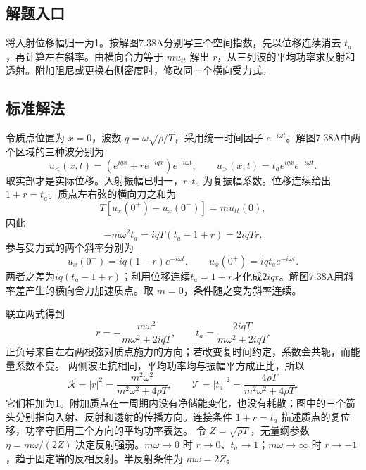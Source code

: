 \documentclass[UTF8,fontset=fandol,a4paper,11pt]{ctexart}
\newcommand{\figcaption}[1]{\par\vspace{2pt}{\small\color{muted}#1}\par}
\begin{document}


\subsection*{解题入口}

将入射位移幅归一为1。按解图7.38A分别写三个空间指数，先以位移连续消去 $t_a$，再计算左右斜率。由横向合力等于 $mu_{tt}$ 解出 $r$，从三列波的平均功率求反射和透射。附加阻尼或更换右侧密度时，修改同一个横向受力式。



\subsection*{标准解法}

\begin{center}\begin{minipage}{\linewidth}\centering{}\figcaption{解图 7.38A}\end{minipage}\end{center}
令质点位置为 $x=0$，波数 $q=\omega\sqrt{\rho/T}$，采用统一时间因子 $e^{-i\omega t}$。解图7.38A中两个区域的三种波分别为
\[u_<(x,t)=(e^{iqx}+r e^{-iqx})e^{-i\omega t},\qquad
u_>(x,t)=t_a e^{iqx}e^{-i\omega t}.\]
取实部才是实际位移。入射振幅已归一，$r,t_a$ 为复振幅系数。位移连续给出 $1+r=t_a$。质点左右弦的横向力之和为
\[T[u_x(0^+)-u_x(0^-)]=m u_{tt}(0),\]
因此
\[-m\omega^2t_a=iqT(t_a-1+r)=2iqTr.\]
参与受力式的两个斜率分别为
\[u_x(0^-)=iq(1-r)e^{-i\omega t},\qquad
u_x(0^+)=iqt_a e^{-i\omega t}.\]
两者之差为$iq(t_a-1+r)$；利用位移连续$t_a=1+r$才化成$2iqr$。解图7.38A用斜率差产生的横向合力加速质点。取 $m=0$，条件随之变为斜率连续。

联立两式得到
\[\boxed{r=-\frac{m\omega^2}{m\omega^2+2iqT},\qquad
 t_a=\frac{2iqT}{m\omega^2+2iqT}.}\]
正负号来自左右两根弦对质点施力的方向；若改变复时间约定，系数会共轭，而能量系数不变。
两侧波阻抗相同，平均功率均与振幅平方成正比，所以
\[\boxed{\mathcal R=|r|^2=\frac{m^2\omega^2}{m^2\omega^2+4\rho T},\qquad
\mathcal T=|t_a|^2=\frac{4\rho T}{m^2\omega^2+4\rho T}.}\]
它们相加为1。附加质点在一周期内没有净储能变化，也没有耗散；图中的三个箭头分别指向入射、反射和透射的传播方向。连接条件 $1+r=t_a$ 描述质点的复位移，功率守恒用三个方向的平均功率表达。
令 $Z=\sqrt{\rho T}$，无量纲参数 $\eta=m\omega/(2Z)$ 决定反射强弱。$m\omega\to0$ 时 $r\to0$、$t_a\to1$；$m\omega\to\infty$ 时 $r\to-1$，趋于固定端的反相反射。半反射条件为 $m\omega=2Z$。
\end{document}
